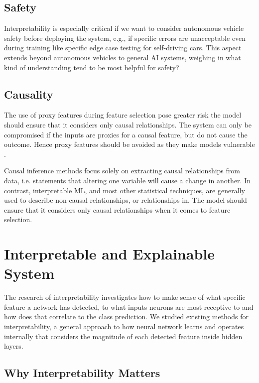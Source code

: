 \subsection{Safety}

Interpretability is especially critical if we want to consider autonomous vehicle \cite{shannon_mattern} safety before deploying the system, e.g., if specific errors are unacceptable even during training like specific edge case testing for self-driving cars. This aspect extends beyond autonomous vehicles to general AI systems, weighing in what kind of understanding tend to be most helpful for safety?

\subsection*{Causality}

The use of proxy features during feature selection pose greater risk the model should ensure that it considers only causal relationships. The system can only be compromised if the inputs are proxies for a causal feature, but do not cause the outcome. Hence proxy features should be avoided as they make models vulnerable \cite{molnar}.

Causal inference methods focus solely on extracting causal relationships from data, i.e. statements that altering one variable will cause a change in another. In contrast, interpretable ML, and most other statistical techniques, are generally used to describe non-causal relationships, or relationships in. The model should ensure that it considers only causal relationships when it comes to feature selection.

\section{Interpretable and Explainable System}

The research of interpretability investigates how to make sense of what specific feature a network has detected, to what inputs neurons are most receptive to and how does that correlate to the class prediction. We studied existing methods for interpretability, a general approach to how neural network learns and operates internally that considers the magnitude of each detected feature inside hidden layers.

\subsection{Why Interpretability Matters}

